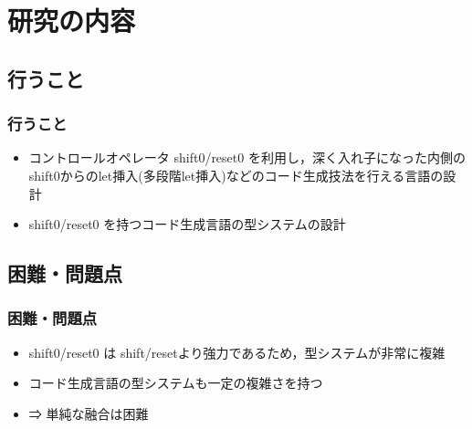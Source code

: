 \documentclass[dvipdfmx,cjk,xcolor=dvipsnames,envcountsect,notheorems,12pt]{beamer}
\theoremstyle{definition}
\begin{document}
\section{研究の内容}
\subsection{行うこと}

\begin{frame}
  \frametitle{行うこと}
  \begin{itemize}
  \item コントロールオペレータ shift0/reset0 を利用し，深く入れ子になった内側のshift0からのlet挿入(多段階let挿入)などのコード生成技法を行える言語の設計
  \item shift0/reset0 を持つコード生成言語の型システムの設計
  \end{itemize}
\end{frame}

\subsection{困難・問題点}

\begin{frame}
  \frametitle{困難・問題点}
  \begin{itemize}
  \item shift0/reset0 は shift/resetより強力であるため，型システムが非常に複雑
  \item コード生成言語の型システムも一定の複雑さを持つ
  \item ⇒ 単純な融合は困難
  \end{itemize}
\end{frame}


\end{document}
